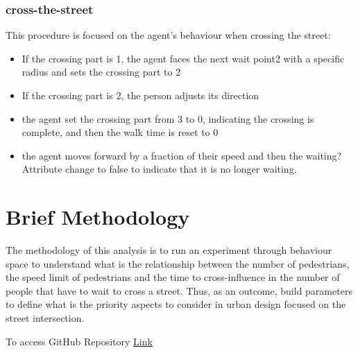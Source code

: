 \documentclass[10pt]{report}
\numberwithin{figure}{section}
\numberwithin{table}{section}
\begin{document}
\subsubsection{cross-the-street}

This procedure is focused on the agent's behaviour when crossing the street:
\begin{itemize}
    \item If the crossing part is 1, the agent faces the next wait point2 with a specific radius and sets the crossing part to 2
    \item If the crossing part is 2, the person adjusts its direction
    \item the agent set the crossing part from 3 to 0, indicating the crossing is complete, and then the walk time is reset to 0
    \item the agent moves forward by a fraction of their speed and then the waiting? Attribute change to false to indicate that it is no longer waiting.
\end{itemize}

\section{Brief Methodology }

The methodology of this analysis is to run an experiment through behaviour space to understand what is the relationship between the number of pedestrians, the speed limit of pedestrians and the time to cross-influence in the number of people that have to wait to cross a street. Thus, as an outcome, build parameters to define what is the priority aspects to consider in urban design focused on the street intersection.








\newpage
\printbibliography[title = {References}]

\vspace{5mm} %

To access GitHub Repository \href{https://github.com/brfelipealmeida/ABM_coursework}{Link}
\end{document}

